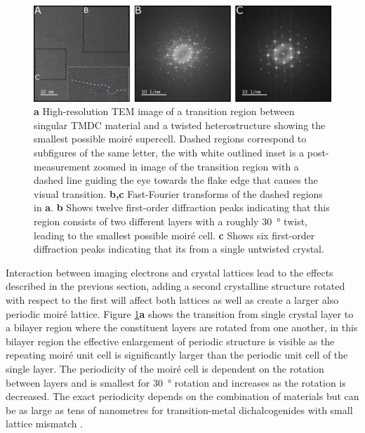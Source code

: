 \begin{figure}[h]
    \centering
    \includegraphics[width=1\linewidth, keepaspectratio]{resources/Figures/moire_transition.png}
    \caption{\textbf{a} High-resolution TEM image of a transition region between singular TMDC material and a twisted heterostructure showing the smallest possible moiré supercell. Dashed regions correspond to subfigures of the same letter, the with white outlined inset is a post-measurement zoomed in image of the transition region with a dashed line guiding the eye towards the flake edge that causes the visual transition. \textbf{b,c} Fast-Fourier transforms of the dashed regions in \textbf{a}. \textbf{b} Shows twelve first-order diffraction peaks indicating that this region consists of two different layers with a roughly \SI{30}{\degree} twist, leading to the smallest possible moiré cell. \textbf{c} Shows six first-order diffraction peaks indicating that its from a single untwisted  crystal. }
    \label{fig:moire_trans}
\end{figure}

Interaction between imaging electrons and crystal lattices lead to the effects described in the previous section, adding a second crystalline structure rotated with respect to the first will affect both lattices as well as create a larger also periodic moiré lattice.
Figure \ref{fig:moire_trans}\textbf{a} shows the transition from single crystal layer to a bilayer region where the constituent layers are rotated from one another, in this bilayer region the effective enlargement of periodic structure is visible as the repeating moiré unit cell is significantly larger than the periodic unit cell of the single layer. The periodicity of the moiré cell is dependent on the rotation between layers and is smallest for \SI{30}{\degree} rotation and increases as the rotation is decreased. The exact periodicity depends on the combination of materials but can be as large as tens of nanometres for transition-metal dichalcogenides with small lattice mismatch \cite{rosenbergerAtomicReconstructionMoire}.

